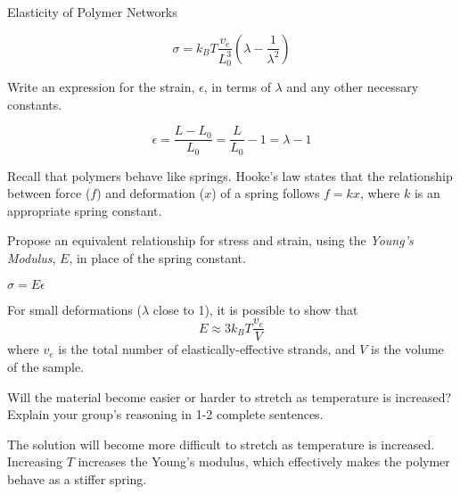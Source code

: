 \begin{activity}{Elasticity of Polymer Networks}
\begin{ctqs}
		\begin{solution}[0.8in]
			\begin{equation*}
				\sigma = k_BT\frac{v_e}{L_0^3}\left(\lambda - \frac{1}{\lambda^2}\right)
			\end{equation*}
		\end{solution}

	\question Write an expression for the strain, $\epsilon$, in terms of $\lambda$ and any other necessary constants.
	
		\begin{solution}[0.8in]
			\begin{equation*}
				\epsilon = \frac{L-L_0}{L_0} = \frac{L}{L_0} -1 = \lambda - 1
			\end{equation*}
		\end{solution}
		
	\question Recall that polymers behave like springs.  Hooke's law states that the relationship between force ($f$) and deformation ($x$) of a spring follows $f=kx$, where $k$ is an appropriate spring constant.
	
		Propose an equivalent relationship for stress and strain, using the \emph{Young's Modulus}, $E$, in place of the spring constant.
		
		\label{\labelbase:ctq:sigmaEeps}
		
			\begin{solution}[0.5in]
			
				$\sigma = E\epsilon$
				
			\end{solution}
	
\end{ctqs}

\begin{infobox}
	For small deformations ($\lambda$ close to 1), it is possible to show that
	\begin{equation*}
		E \approx 3k_BT\frac{v_e}{V}
		\label{\labelbase:eqn:youngsmodulus}
	\end{equation*}
	where $v_e$ is the total number of elastically-effective strands, and $V$ is the volume of the sample.
\end{infobox}

\begin{ctqs}
	\question Will the material become easier or harder to stretch as temperature is increased?  Explain your group's reasoning in 1-2 complete sentences.
	
		\begin{solution}[1.5in]
			The solution will become more difficult to stretch as temperature is increased.  Increasing $T$ increases the Young's modulus, which effectively makes the polymer behave as a stiffer spring.
		\end{solution}
	

\end{ctqs}
\end{activity}

